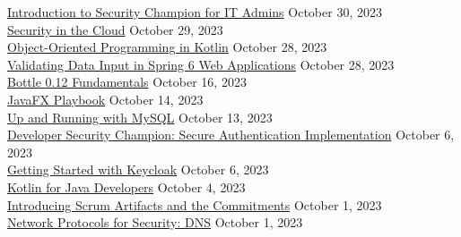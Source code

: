 \documentclass[10pt]{res} %
\begin{document}
\begin{resume}
\href{https://bjdelacruz.dev/files/certificates/pluralsight/Introduction_to_Security_Champion_for_IT_Admins.pdf}{\color{blue}Introduction to Security Champion for IT Admins} \hfill October 30, 2023 \\
\href{https://bjdelacruz.dev/files/certificates/pluralsight/Security_in_the_Cloud.pdf}{\color{blue}Security in the Cloud} \hfill October 29, 2023 \\
\href{https://bjdelacruz.dev/files/certificates/pluralsight/Object_Oriented_Programming_in_Kotlin.pdf}{\color{blue}Object-Oriented Programming in Kotlin} \hfill October 28, 2023 \\
\href{https://bjdelacruz.dev/files/certificates/pluralsight/Validating_Data_Input_in_Spring_6_Web_Applications.pdf}{\color{blue}Validating Data Input in Spring 6 Web Applications} \hfill October 28, 2023 \\
\href{https://bjdelacruz.dev/files/certificates/pluralsight/Bottle_0_12_Fundamentals.pdf}{\color{blue}Bottle 0.12 Fundamentals} \hfill October 16, 2023 \\
\href{https://bjdelacruz.dev/files/certificates/pluralsight/JavaFX_Playbook.pdf}{\color{blue}JavaFX Playbook} \hfill October 14, 2023 \\
\href{https://bjdelacruz.dev/files/certificates/pluralsight/Up_and_Running_with_MySQL.pdf}{\color{blue}Up and Running with MySQL} \hfill October 13, 2023 \\
\href{https://bjdelacruz.dev/files/certificates/pluralsight/Developer_Security_Champion_-_Secure_Authentication_Implementation.pdf}{\color{blue}Developer Security Champion: Secure Authentication Implementation} \hfill October 6, 2023 \\
\href{https://bjdelacruz.dev/files/certificates/pluralsight/Getting_Started_with_Keycloak.pdf}{\color{blue}Getting Started with Keycloak} \hfill October 6, 2023 \\
\href{https://bjdelacruz.dev/files/certificates/pluralsight/Kotlin_for_Java_Developers.pdf}{\color{blue}Kotlin for Java Developers} \hfill October 4, 2023 \\
\href{https://bjdelacruz.dev/files/certificates/pluralsight/4_Introducing_Scrum_Artifacts_and_the_Commitments.pdf}{\color{blue}Introducing Scrum Artifacts and the Commitments} \hfill October 1, 2023 \\
\href{https://bjdelacruz.dev/files/certificates/pluralsight/8_Network_Protocols_for_Security_DNS.pdf}{\color{blue}Network Protocols for Security: DNS} \hfill October 1, 2023 \\

\end{resume}
\end{document}
